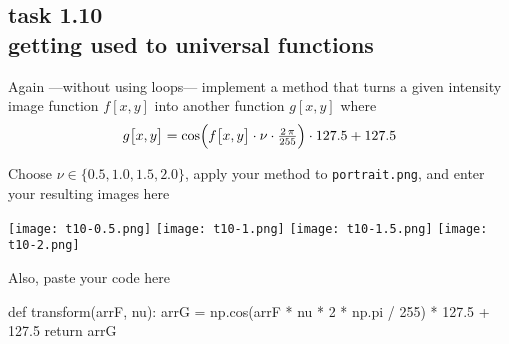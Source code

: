 
\subsection*{task 1.10 \\[1ex] getting used to universal functions}

Again ---without using  loops--- implement a method that turns a given intensity image function $f[x, y]$ into another function $g[x, y]$ where
\begin{equation*}
g \bigl[ x, y \bigr] = \cos \Bigl( f \bigl[ x, y \bigr] \cdot \nu \cdot \tfrac{2\,\pi}{255} \Bigr) \cdot 127.5 + 127.5
\end{equation*}

\vspace{1cm}
Choose $\nu \in \{ 0.5, 1.0, 1.5, 2.0 \}$, apply your method to \texttt{portrait.png}, and enter your resulting images here
\begin{center}
\texttt{[image: t10-0.5.png]} \hfill
\texttt{[image: t10-1.png]} \hfill
\texttt{[image: t10-1.5.png]} \hfill
\texttt{[image: t10-2.png]} 
\end{center}



\vspace{2cm}
Also, paste your code here \\[1ex]
\begin{python}
def transform(arrF, nu):
    arrG = np.cos(arrF * nu * 2 * np.pi / 255) * 127.5 + 127.5
    return arrG
\end{python}






